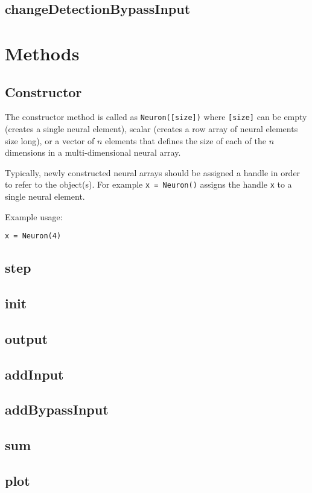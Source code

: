 \documentclass[phd, 12pt, doublespace, online]{fauthesis}
\begin{document}
\subsection{changeDetectionBypassInput}

\section{Methods}

\subsection{Constructor}

The constructor method is called as {\tt Neuron([size])} where {\tt [size]} can be empty (creates a single neural element), scalar (creates a row array of neural elements size long), or a vector of $n$ elements that defines the size of each of the $n$ dimensions in a multi-dimensional neural array. 

Typically, newly constructed neural arrays should be assigned a handle in order to refer to the object(s). For example {\tt x = Neuron()} assigns the handle {\tt x} to a single neural element. 

Example usage:

{\tt x = Neuron(4)}



\subsection{step}
\subsection{init}
\subsection{output}
\subsection{addInput}
\subsection{addBypassInput}
\subsection{sum}
\subsection{plot}
\end{document}
